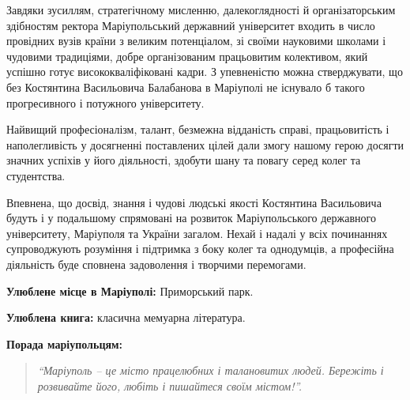 
Завдяки зусиллям, стратегічному мисленню, далекоглядності й організаторським
здібностям ректора Маріупольський державний університет входить в число
провідних вузів країни з великим потенціалом, зі своїми науковими школами і
чудовими традиціями, добре організованим працьовитим колективом, який успішно
готує висококваліфіковані кадри. З упевненістю можна стверджувати, що без
Костянтина Васильовича Балабанова в Маріуполі не існувало б такого
прогресивного і потужного університету.

Найвищий професіоналізм, талант, безмежна відданість справі, працьовитість і
наполегливість у досягненні поставлених цілей дали змогу нашому герою досягти
значних успіхів у його діяльності, здобути шану та повагу серед колег та
студентства.

Впевнена, що досвід, знання і чудові людські якості Костянтина Васильовича
будуть і у подальшому спрямовані на розвиток Маріупольського державного
університету, Маріуполя та України загалом. Нехай і надалі у всіх починаннях
супроводжують розуміння і підтримка з боку колег та однодумців, а професійна
діяльність буде сповнена задоволення і творчими перемогами.


\textbf{Улюблене місце в Маріуполі:} Приморський парк.

\textbf{Улюблена книга:} класична мемуарна література.

\textbf{Порада маріупольцям:} 

\begin{quote}
\em\enquote{Маріуполь – це місто працелюбних і талановитих людей. Бережіть і розвивайте його, любіть і пишайтеся своїм містом!}.
\end{quote}

